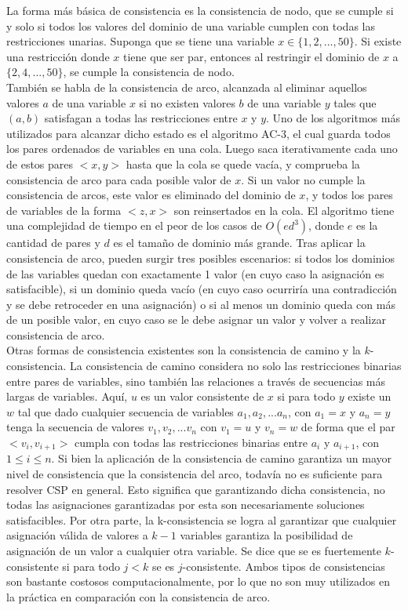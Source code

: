 \documentclass[12pt]{report}
\begin{document}
La forma más básica de consistencia es la consistencia de nodo, que se cumple si y solo si todos los valores del dominio de una variable cumplen con todas las restricciones unarias. Suponga que se tiene una variable $x \in \{1,2,...,50\}$. Si existe una restricción donde $x$ tiene que ser par, entonces al restringir el dominio de $x$ a $\{2,4,...,50\}$, se cumple la consistencia de nodo.\\

También se habla de la consistencia de arco, alcanzada al eliminar aquellos valores $a$ de una variable $x$ si no existen valores $b$ de una variable $y$ tales que $(a,b)$ satisfagan a todas las restricciones entre $x$ y $y$. Uno de los algoritmos más utilizados para alcanzar dicho estado es el algoritmo AC-3, el cual guarda todos los pares ordenados de variables en una cola. Luego saca iterativamente cada uno de estos pares $<x,y>$ hasta que la cola se quede vacía, y comprueba la consistencia de arco para cada posible valor de $x$. Si un valor no cumple la consistencia de arcos, este valor es eliminado del dominio de $x$, y todos los pares de variables de la forma $<z,x>$ son reinsertados en la cola. El algoritmo tiene una complejidad de tiempo en el peor de los casos de $O(ed^3 )$, donde $e$ es la cantidad de pares y $d$ es el tamaño de dominio más grande. Tras aplicar la consistencia de arco, pueden surgir tres posibles escenarios: si todos los dominios de las variables quedan con exactamente 1 valor (en cuyo caso la asignación es satisfacible), si un dominio queda vacío (en cuyo caso ocurriría una contradicción y se debe retroceder en una asignación) o si al menos un dominio queda con más de un posible valor, en cuyo caso se le debe asignar un valor y volver a realizar consistencia de arco.\\

Otras formas de consistencia existentes son la consistencia de camino y la $k$-consistencia. La consistencia de camino considera no solo las restricciones binarias entre pares de variables, sino también las relaciones a través de secuencias más largas de variables. Aquí, $u$ es un valor consistente de $x$ si para todo $y$ existe un $w$ tal que dado cualquier secuencia de variables $a_1, a_2, ... a_n$, con $a_1=x$ y $a_n=y$ tenga la secuencia de valores $v_1, v_2, ... v_n$ con $v_1=u$ y $v_n=w$ de forma que el par $<v_i,v_{i+1}>$ cumpla con todas las restricciones binarias entre $a_i$ y $a_{i+1}$, con $1\leq  i \leq  n$. Si bien la aplicación de la consistencia de camino garantiza un mayor nivel de consistencia que la consistencia del arco, todavía no es suficiente para resolver CSP en general. Esto significa que garantizando dicha consistencia, no todas las asignaciones garantizadas por esta son necesariamente soluciones satisfacibles. Por otra parte, la k-consistencia se logra al garantizar que cualquier asignación válida de valores a $k-1$ variables garantiza la posibilidad de asignación de un valor a cualquier otra variable. Se dice que se es fuertemente $k$-consistente si para todo $j<k$ se es $j$-consistente. Ambos tipos de consistencias son bastante costosos computacionalmente, por lo que no son muy utilizados en la práctica en comparación con la consistencia de arco.\\
\end{document}
